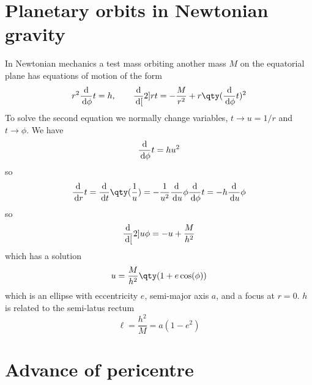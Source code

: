 \section{Planetary orbits in Newtonian gravity}
\label{sec:plan-orbits-newt}

In Newtonian mechanics a test mass orbiting another mass $M$ on the
equatorial plane has equations of motion of the form
\begin{equation}
  \label{eq:147}
  r^2 \dv{\phi}{t} = h , \qquad \dv[2]{r}{t} = - \frac{M}{r^2} + r \qty( \dv{\phi}{t} )^2
\end{equation}
To solve the second equation we normally change variables, $t \to u =
1/r$ and $t \to \phi$. We have \[ \frac{\mathrm{d}}{\,\mathrm{d} \phi}{t} = hu^2 \] so
\begin{equation}
  \label{eq:148}
  \dv{r}{t} = \dv{t} \qty(\frac{1}{u}) = - \frac{1}{u^2} \dv{u}{\phi} \dv{\phi}{t} = - h \dv{u}{\phi} 
\end{equation}
so
\begin{equation}
  \label{eq:149}
  \frac{\mathrm{d}}{\,\mathrm{d} [}2]{u}{\phi} = -u + \frac{M}{h^2}
\end{equation}
which has a solution
\begin{equation}
  \label{eq:150}
  u = \frac{M}{h^2} \qty( 1+ e \cos(\phi))
\end{equation}
which is an ellipse with eccentricity $e$, semi-major axis $a$, and a
focus at $r=0$. $h$ is related to the semi-latus rectum
\[ \ell = \frac{h^2}{M} = a(1-e^2) \]


\section{Advance of pericentre}
\label{sec:advance-pericentre}

